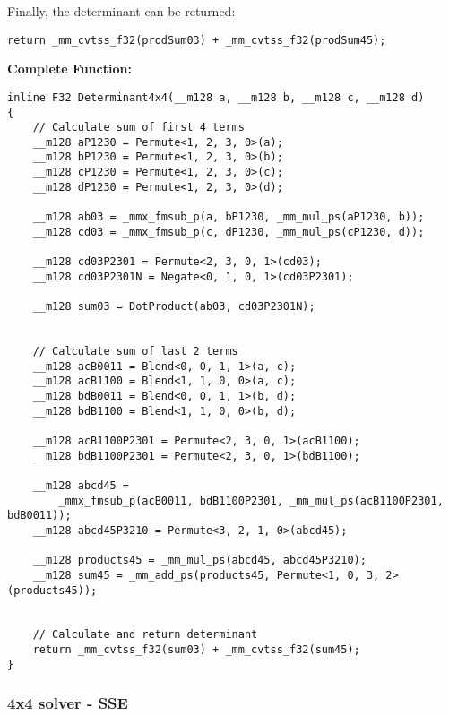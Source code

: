 Finally, the determinant can be returned:

\begin{verbatim}
return _mm_cvtss_f32(prodSum03) + _mm_cvtss_f32(prodSum45);
\end{verbatim}




\vspace{1cm}
\textbf{Complete Function:}

\begin{verbatim}
inline F32 Determinant4x4(__m128 a, __m128 b, __m128 c, __m128 d)
{
    // Calculate sum of first 4 terms
    __m128 aP1230 = Permute<1, 2, 3, 0>(a);
    __m128 bP1230 = Permute<1, 2, 3, 0>(b);
    __m128 cP1230 = Permute<1, 2, 3, 0>(c);
    __m128 dP1230 = Permute<1, 2, 3, 0>(d);

    __m128 ab03 = _mmx_fmsub_p(a, bP1230, _mm_mul_ps(aP1230, b));
    __m128 cd03 = _mmx_fmsub_p(c, dP1230, _mm_mul_ps(cP1230, d));

    __m128 cd03P2301 = Permute<2, 3, 0, 1>(cd03);
    __m128 cd03P2301N = Negate<0, 1, 0, 1>(cd03P2301);

    __m128 sum03 = DotProduct(ab03, cd03P2301N);


    // Calculate sum of last 2 terms
    __m128 acB0011 = Blend<0, 0, 1, 1>(a, c);
    __m128 acB1100 = Blend<1, 1, 0, 0>(a, c);
    __m128 bdB0011 = Blend<0, 0, 1, 1>(b, d);
    __m128 bdB1100 = Blend<1, 1, 0, 0>(b, d);

    __m128 acB1100P2301 = Permute<2, 3, 0, 1>(acB1100);
    __m128 bdB1100P2301 = Permute<2, 3, 0, 1>(bdB1100);

    __m128 abcd45 = 
        _mmx_fmsub_p(acB0011, bdB1100P2301, _mm_mul_ps(acB1100P2301, bdB0011));
    __m128 abcd45P3210 = Permute<3, 2, 1, 0>(abcd45);

    __m128 products45 = _mm_mul_ps(abcd45, abcd45P3210);
    __m128 sum45 = _mm_add_ps(products45, Permute<1, 0, 3, 2>(products45));


    // Calculate and return determinant
    return _mm_cvtss_f32(sum03) + _mm_cvtss_f32(sum45);
}
\end{verbatim}




\newpage
\subsubsection{4x4 solver - SSE}

